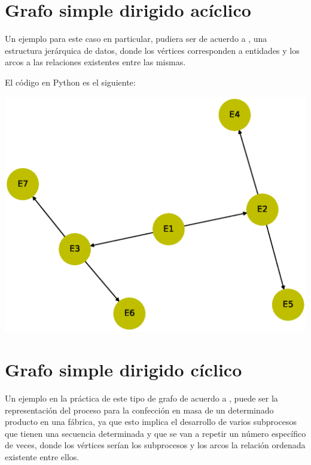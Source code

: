 \documentclass[10pt,a4paper]{article}
\begin{document}
\section{Grafo simple dirigido acíclico}

Un ejemplo para este caso en particular, pudiera ser de acuerdo a \cite{art2}, una estructura jerárquica de datos, donde los vértices corresponden a entidades y los arcos a las relaciones existentes entre las mismas.\vspace{.4cm}

El código en Python es el siguiente:



\begin{center}

\includegraphics[scale=0.4]{GDA}

\end{center}

\section{Grafo simple dirigido cíclico}

Un ejemplo en la práctica de este tipo de grafo de acuerdo a \cite{art2}, puede ser la representación del proceso para la confección en masa de un determinado producto en una fábrica, ya que esto implica el desarrollo de varios subprocesos que tienen una secuencia determinada y que se van a repetir un número específico de veces, donde los vértices serían los subprocesos y los arcos la relación ordenada existente entre ellos.\vspace*{.4cm}
\end{document}
